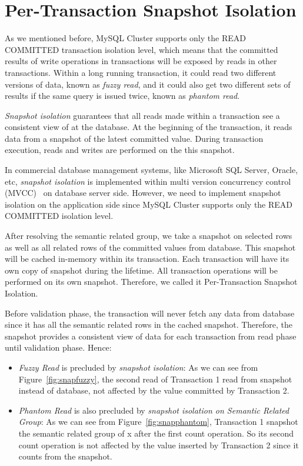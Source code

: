 \section{Per-Transaction Snapshot Isolation}

As we mentioned before, MySQL Cluster supports only the READ COMMITTED transaction isolation level, which means that the committed results of write operations in transactions will be exposed by reads in other transactions. Within a long running transaction, it could read two different versions of data, known as \textit{fuzzy read}, and it could also get two different sets of results if the same query is issued twice, known as \textit{phantom read}.

\noindent \textit{Snapshot isolation} guarantees that all reads made within a transaction see a consistent view of at the database. At the beginning of the transaction, it reads data from a snapshot of the latest committed value. During transaction execution, reads and writes are performed on the this snapshot.

\noindent In commercial database management systems, like Microsoft SQL Server, Oracle, etc, \textit{snapshot isolation} is implemented within multi version concurrency control (MVCC)~\cite{berenson1995critique} on database server side. However, we need to implement snapshot isolation on the application side since MySQL Cluster supports only the READ COMMITTED isolation level.

\noindent After resolving the semantic related group, we take a snapshot on selected rows as well as all related rows of the committed values from database. This snapshot will be cached in-memory within its transaction. Each transaction will have its own copy of snapshot during the lifetime. All transaction operations will be performed on its own snapshot. Therefore, we called it Per-Transaction Snapshot Isolation.

\noindent Before validation phase, the transaction will never fetch any data from database since it has all the semantic related rows in the cached snapshot. Therefore, the snapshot provides a consistent view of data for each transaction from read phase until validation phase. Hence: 
\begin{itemize}[noitemsep]
	\item \textit{Fuzzy Read} is precluded by \textit{snapshot isolation}: As we can see from Figure~\ref{fig:snapfuzzy}, the second read of Transaction 1 read from snapshot instead of database, not affected by the value committed by Transaction 2.
	
	\item \textit{Phantom Read} is also precluded by \textit{snapshot isolation on Semantic Related Group}: As we can see from Figure~\ref{fig:snapphantom}, Transaction 1 snapshot the semantic related group of x after the first count operation. So its second count operation is not affected by the value inserted by Transaction 2 since it counts from the snapshot.
	
\end{itemize} 

